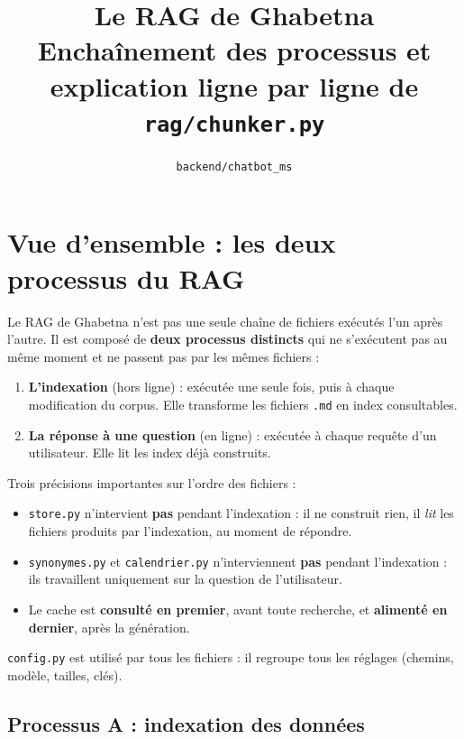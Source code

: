 \documentclass[11pt,a4paper]{article}
\title{Le RAG de Ghabetna\\[4pt]
\large Enchaînement des processus et explication ligne par ligne de \texttt{rag/chunker.py}}
\author{\texttt{backend/chatbot\_ms}}
\date{}
\newcommand{\fichier}[1]{\texttt{#1}}
\begin{document}
\maketitle
\tableofcontents
\newpage


\section{Vue d'ensemble : les deux processus du RAG}

Le RAG de Ghabetna n'est pas une seule chaîne de fichiers exécutés l'un après l'autre. Il est
composé de \textbf{deux processus distincts} qui ne s'exécutent pas au même moment et ne
passent pas par les mêmes fichiers :

\begin{enumerate}
  \item \textbf{L'indexation} (hors ligne) : exécutée une seule fois, puis à chaque
        modification du corpus. Elle transforme les fichiers \fichier{.md} en index
        consultables.
  \item \textbf{La réponse à une question} (en ligne) : exécutée à chaque requête d'un
        utilisateur. Elle lit les index déjà construits.
\end{enumerate}

Trois précisions importantes sur l'ordre des fichiers :

\begin{itemize}
  \item \fichier{store.py} n'intervient \textbf{pas} pendant l'indexation : il ne construit
        rien, il \emph{lit} les fichiers produits par l'indexation, au moment de répondre.
  \item \fichier{synonymes.py} et \fichier{calendrier.py} n'interviennent \textbf{pas}
        pendant l'indexation : ils travaillent uniquement sur la question de l'utilisateur.
  \item Le cache est \textbf{consulté en premier}, avant toute recherche, et
        \textbf{alimenté en dernier}, après la génération.
\end{itemize}

\fichier{config.py} est utilisé par tous les fichiers : il regroupe tous les réglages
(chemins, modèle, tailles, clés).

\subsection{Processus A : indexation des données}
\end{document}
